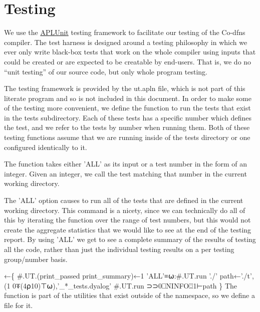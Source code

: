 \documentclass{article}%
\begin{document}
\section{Testing}

We use the \href{https://github.com/Co-dfns/APLUnit}{APLUnit}
testing framework to facilitate our testing of the Co-dfns compiler.
The test harness is designed around a testing philosophy in which we
ever only write black-box tests that work on the whole compiler
using inputs that could be created or are expected to be creatable
by end-users.
That is, we do no ``unit testing'' of our source code,
but only whole program testing.

The testing framework is provided by the {\Tt{}ut.apln\nwendquote} file,
which is not part of this literate program and so is not included in
this document.
In order to make some of the testing more convenient,
we define the function {\Tt{}\nwendquote} to run the tests
that exist in the {\Tt{}tests{\nwbackslash}\nwendquote} subdirectory.
Each of these tests has a specific number which defines the test,
and we refer to the tests by number when running them.
Both of these testing functions assume that we are running inside
of the {\Tt{}tests{\nwbackslash}\nwendquote} directory or one configured identically to it.

The {\Tt{}\nwendquote} function takes either {\Tt{}'ALL'\nwendquote} as its input or a test
number in the form of an integer.
Given an integer, we call the test matching that number in the
current working directory.

The {\Tt{}'ALL'\nwendquote} option causes {\Tt{}\nwendquote} to run all of the tests that are
defined in the current working directory.
This command is a nicety, since we can technically do all of this
by iterating the {\Tt{}\nwendquote} function over the range of test numbers,
but this would not create the aggregate statistics that we would
like to see at the end of the testing report.
By using {\Tt{}'ALL'\nwendquote} we get to see a complete summary of the
results of testing all the code,
rather than just the individual testing results on a per testing
group/number basis.

\nwenddocs{}\endmoddef\nwstartdeflinemarkup\nwenddeflinemarkup
{}←\{
        #.UT.(print_passed print_summary)←1
        'ALL'≡⍵:#.UT.run './'
        path←'./t',(1 0⍕(4⍴10)⊤⍵),'_*_tests.dyalog'
        #.UT.run ⊃⊃0⎕NINFO⍠1⊢path
\}
\eatline
\nwnotused{[[TEST]]}\nwendcode{}\nwdocspar
The {\Tt{}\nwendquote} function is part of the utilities that exist outside
of the {\Tt{}\nwendquote} namespace, 
so we define a file for it.
\end{document}
